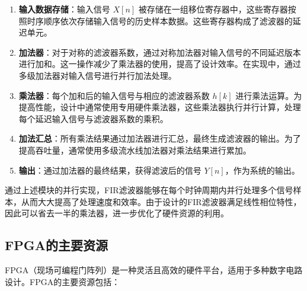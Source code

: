 \begin{enumerate}
    \item \textbf{输入数据存储}：输入信号 \( X[n] \) 被存储在一组移位寄存器中，这些寄存器按照时序顺序依次存储输入信号的历史样本数据。这些寄存器构成了滤波器的延迟单元。
    
    \item \textbf{加法器}：对于对称的滤波器系数，通过对称加法器对输入信号的不同延迟版本进行加和。这一操作减少了乘法器的使用，提高了设计效率。在实现中，通过多级加法器对输入信号进行并行加法处理。
    
    \item \textbf{乘法器}：每个加和后的输入信号与相应的滤波器系数 \( h[k] \) 进行乘法运算。为提高性能，设计中通常使用专用硬件乘法器，这些乘法器执行并行计算，处理每个延迟输入信号与滤波器系数的乘积。
    
    \item \textbf{加法汇总}：所有乘法结果通过加法器进行汇总，最终生成滤波器的输出。为了提高吞吐量，通常使用多级流水线加法器对乘法结果进行累加。
    
    \item \textbf{输出}：通过加法器的最终结果，获得滤波后的信号 \( Y[n] \)，作为系统的输出。
\end{enumerate}

通过上述模块的并行实现，FIR滤波器能够在每个时钟周期内并行处理多个信号样本，从而大大提高了处理速度和效率。由于设计的FIR滤波器满足线性相位特性，因此可以省去一半的乘法器，进一步优化了硬件资源的利用。

\subsection{FPGA的主要资源}

FPGA（现场可编程门阵列）是一种灵活且高效的硬件平台，适用于多种数字电路设计。FPGA的主要资源包括：


